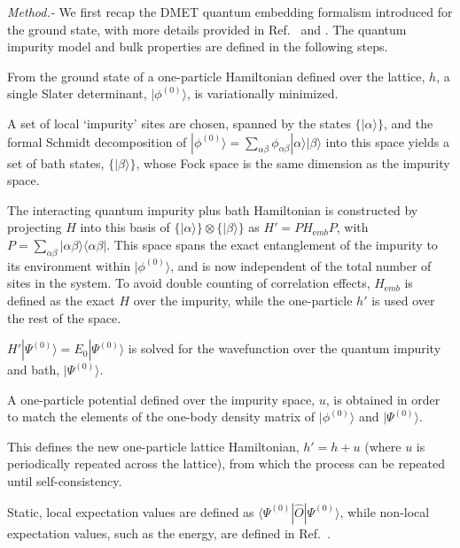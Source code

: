 \documentclass[aps,twocolumn,nobibnotes]{revtex4}
\begin{document}
\emph{Method.-} We first recap the DMET quantum embedding formalism introduced for the ground state, with more details provided in
Ref.~ and . The 
quantum impurity model and bulk properties are defined in the following steps.
\begin{inparaenum}
\item From the ground state of a one-particle Hamiltonian defined over the lattice, $h$, a single Slater determinant, $|\phi^{(0)}\rangle$, is variationally minimized.
\item A set of local `impurity' sites are chosen, spanned by the states $\{ |\alpha \rangle \}$, and the formal Schmidt decomposition of $|\phi^{(0)}\rangle = \sum_{\alpha \beta} \phi_{\alpha \beta} |\alpha \rangle |\beta \rangle$ into this space
yields a set of bath states, $\{ |\beta \rangle \}$, whose Fock space is the same dimension as the impurity space.
\item The interacting quantum impurity plus bath Hamiltonian is constructed by projecting $H$ into this basis 
of $\{ | \alpha \rangle \} \otimes \{ | \beta \rangle \}$ as $H'=PH_{\mathrm emb}P$, 
with $P = \sum_{\alpha \beta} |\alpha \beta \rangle \langle \alpha \beta |$. This space spans the exact entanglement of the impurity to its environment 
within $|\phi^{(0)}\rangle$, and is now independent of the total number of sites in the system. To avoid double counting
of correlation effects, $H_{\mathrm emb}$ is defined as the exact $H$ over the impurity, while the one-particle $h'$ is used over the rest of the space.
\item $H'|\Psi^{(0)} \rangle = E_0 |\Psi^{(0)} \rangle$ is solved for the wavefunction over the quantum impurity and bath, $|\Psi^{(0)} \rangle$.
\item A one-particle potential defined over the impurity space, $u$, is obtained in order to match the elements of the one-body density matrix of $|\phi^{(0)}\rangle$ and $|\Psi^{(0)} \rangle$.
\item This defines the new one-particle lattice Hamiltonian, $h' = h + u$ (where $u$ is periodically repeated across the lattice), 
from which the process can be repeated until self-consistency.
\item Static, local expectation values are defined as $\langle \Psi^{(0)} | {\hat O} | \Psi^{(0)} \rangle$, while non-local expectation values, such as the 
energy, are defined in Ref.~.
\end{inparaenum}
\end{document}

